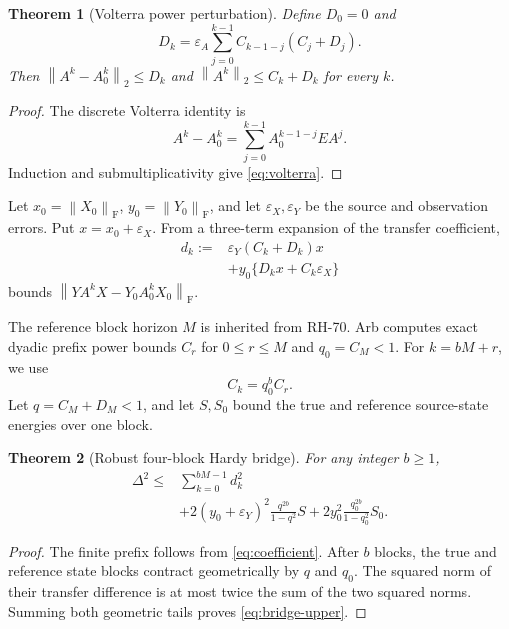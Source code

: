 \documentclass[11pt]{article}
\newtheorem{theorem}{Theorem}[section]
\theoremstyle{definition}
\newcommand{\norm}[1]{\left\lVert#1\right\rVert}
\newcommand{\F}{\mathrm F}
\begin{document}
\begin{theorem}[Volterra power perturbation]
\label{thm:volterra}
Define $D_0=0$ and
\begin{equation}
 D_k=\varepsilon_A
 \sum_{j=0}^{k-1}C_{k-1-j}(C_j+D_j).
 \label{eq:volterra}
\end{equation}
Then $\norm{A^k-A_0^k}_2\le D_k$ and
$\norm{A^k}_2\le C_k+D_k$ for every $k$.
\end{theorem}

\begin{proof}
The discrete Volterra identity is
\[
 A^k-A_0^k
 =\sum_{j=0}^{k-1}A_0^{k-1-j}EA^j.
\]
Induction and submultiplicativity give \eqref{eq:volterra}.
\end{proof}

Let $x_0=\norm{X_0}_{\F}$, $y_0=\norm{Y_0}_{\F}$, and let
$\varepsilon_X,\varepsilon_Y$ be the source and observation errors.  Put
$x=x_0+\varepsilon_X$.  From a three-term expansion of the transfer
coefficient,
\begin{equation}
 \begin{split}
 d_k:={}&\varepsilon_Y(C_k+D_k)x\\
 &+y_0\{D_kx+C_k\varepsilon_X\}
 \end{split}
 \label{eq:coefficient}
\end{equation}
bounds
$\norm{YA^kX-Y_0A_0^kX_0}_{\F}$.

The reference block horizon $M$ is inherited from RH-70.  Arb computes exact
dyadic prefix power bounds $C_r$ for $0\le r\le M$ and
$q_0=C_M<1$.  For $k=bM+r$, we use
\begin{equation}
 C_k=q_0^bC_r.
 \label{eq:block-powers}
\end{equation}
Let $q=C_M+D_M<1$, and let $S,S_0$ bound the true and reference source-state
energies over one block.

\begin{theorem}[Robust four-block Hardy bridge]
\label{thm:bridge}
For any integer $b\ge1$,
\begin{equation}
 \begin{split}
 \Delta^2\le{}&\sum_{k=0}^{bM-1}d_k^2\\
 &+2(y_0+\varepsilon_Y)^2
   \frac{q^{2b}}{1-q^2}S
 +2y_0^2\frac{q_0^{2b}}{1-q_0^2}S_0.
 \end{split}
 \label{eq:bridge-upper}
\end{equation}
\end{theorem}

\begin{proof}
The finite prefix follows from \eqref{eq:coefficient}.  After $b$ blocks, the
true and reference state blocks contract geometrically by $q$ and $q_0$.
The squared norm of their transfer difference is at most twice the sum of the
two squared norms.  Summing both geometric tails proves
\eqref{eq:bridge-upper}.
\end{proof}
\end{document}
